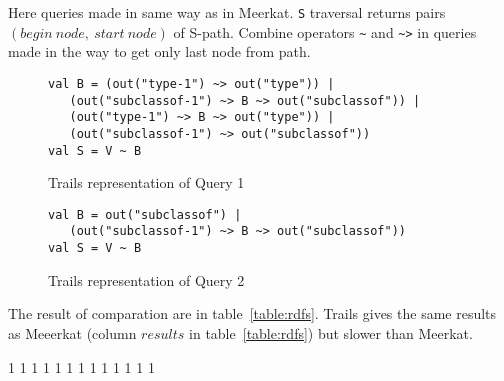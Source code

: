 Here queries made in same way as in Meerkat.
\lstinline{S} traversal returns pairs $(begin\ node,\ start\ node)$ of S-path.
Combine operators \lstinline{~} and \lstinline{~>} in queries made in the way to get only last node from path.


\begin{figure}[h]
\begin{lstlisting}
val B = (out("type-1") ~> out("type")) |
   (out("subclassof-1") ~> B ~> out("subclassof")) |
   (out("type-1") ~> B ~> out("type")) |
   (out("subclassof-1") ~> out("subclassof"))
val S = V ~ B
\end{lstlisting}
\caption{Trails representation of Query 1}
\label{fig:query1Trails}
\end{figure}

\begin{figure}[h]
\begin{lstlisting}
val B = out("subclassof") |
   (out("subclassof-1") ~> B ~> out("subclassof"))
val S = V ~ B
\end{lstlisting}
\caption{Trails representation of Query 2}
\label{fig:query2Trails}
\end{figure}

The result of comparation are in table~\ref{table:rdfs}.
Trails gives the same results as Meeerkat (column $results$ in table~\ref{table:rdfs}) but slower than Meerkat.

1
1
1
1
1
1
1
1
1
1
1
1
1
